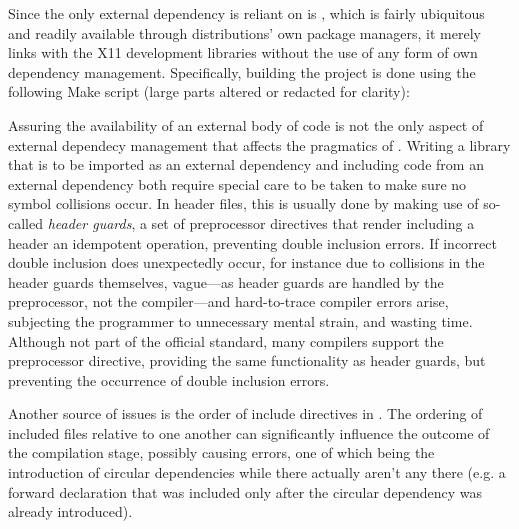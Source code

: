 Since the only external dependency \wmcpp is reliant on is , which
is fairly ubiquitous and readily available through distributions' own package
managers, it merely links with the X11 development libraries without the use of
any form of own dependency management. Specifically, building the project is
done using the following \textup{Make} script (large parts altered or redacted
for clarity):


Assuring the availability of an external body of code is not the only aspect
of external dependecy management that affects the pragmatics of \cpp. Writing
a library that is to be imported as an external dependency and including code
from an external dependency both require special care to be taken to make sure
no symbol collisions occur. In header files, this is usually done by making
use of so-called \textit{header guards}, a set of preprocessor directives that
render including a header an idempotent operation, preventing double inclusion
errors. If incorrect double inclusion does unexpectedly occur, for instance
due to collisions in the header guards themselves, vague---as header guards
are handled by the preprocessor, not the compiler---and hard-to-trace compiler
errors arise, subjecting the programmer to unnecessary mental strain, and
wasting time. Although not part of the official standard\cite{cppstd}, many \cpp
compilers support the  preprocessor directive, providing the
same functionality as header guards, but preventing the occurrence of double
inclusion errors.

Another source of issues is the order of include directives in \cpp. The
ordering of included files relative to one another can significantly influence
the outcome of the compilation stage, possibly causing errors, one of which
being the introduction of circular dependencies while there actually aren't any
there (e.g. a forward declaration that was included only after the circular
dependency was already introduced).




